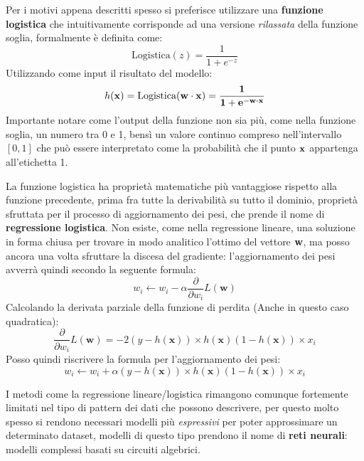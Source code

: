 \documentclass[../../main.tex]{subfiles}
\begin{document}
    Per i motivi appena descritti spesso si preferisce utilizzare una \textbf{funzione logistica} che intuitivamente corrisponde ad una versione \textit{rilassata} della funzione soglia, formalmente è definita come:
    \[ \text{Logistica}(z) = \frac{1}{1 + e^{-z}}\]
    Utilizzando come input il risultato del modello:
    \[h(\bf{x}) = \text{Logistica}(\bf{w} \cdot \boldsymbol{x}) = \frac{1}{1 + e^{- \boldsymbol{w \cdot x}}}\]
    Importante notare come l'output della funzione non sia più, come nella funzione soglia, un numero tra 0 e 1, bensì un valore continuo compreso nell'intervallo $[0, 1]$ che può essere interpretato come la probabilità che il punto $\bf{x}$ appartenga all'etichetta 1.

    La funzione logistica ha proprietà matematiche più vantaggiose rispetto alla funzione precedente, prima fra tutte la derivabilità su tutto il dominio, proprietà sfruttata per il processo di aggiornamento dei pesi, che prende il nome di \textbf{regressione logistica}. Non esiste, come nella regressione lineare, una soluzione in forma chiusa per trovare in modo analitico l'ottimo del vettore $\bf{w}$, ma posso ancora una volta sfruttare la discesa del gradiente: l'aggiornamento dei pesi avverrà quindi secondo la seguente formula:
    \[w_i \leftarrow w_i - \alpha \frac{\partial}{\partial w_i} L(\boldsymbol{w})\]
    Calcolando la derivata parziale della funzione di perdita (Anche in questo caso quadratica):
    \[\frac{\partial}{\partial w_i} L(\boldsymbol{w}) = -2 (y - h(\boldsymbol{x})) \times h(\boldsymbol{x})(1 - h(\boldsymbol{x})) \times x_i\]
    Posso quindi riscrivere la formula per l'aggiornamento dei pesi:
    \[w_i \leftarrow w_i + \alpha (y - h(\boldsymbol{x})) \times h(\boldsymbol{x})(1 - h(\boldsymbol{x})) \times x_i\]

    I metodi come la regressione lineare/logistica rimangono comunque fortemente limitati nel tipo di pattern dei dati che possono descrivere, per questo molto spesso si rendono necessari modelli più \textit{espressivi} per  poter approssimare un determinato dataset, modelli di questo tipo prendono il nome di \textbf{reti neurali}: modelli complessi basati su circuiti algebrici.
\end{document}
